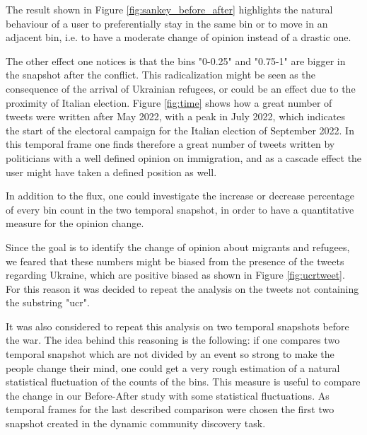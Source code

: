\documentclass[sigchi]{acmart}
\begin{document}
The result shown in Figure \ref{fig:sankey_before_after} highlights the natural behaviour of a user to preferentially stay in the same bin or to move in an adjacent bin, i.e. to have a moderate change of opinion instead of a drastic one.

The other effect one notices is that the bins "0-0.25" and "0.75-1" are bigger in the snapshot after the conflict. This radicalization might be seen as the consequence of the arrival of Ukrainian refugees, or could be an effect due to the proximity of Italian election. Figure \ref{fig:time} shows how a great number of tweets were written after May 2022, with a peak in July 2022, which indicates the start of the electoral campaign for the Italian election of September 2022. In this temporal frame one finds therefore a great number of tweets written by politicians with a well defined opinion on immigration, and as a cascade effect the user might have taken a defined position as well.


In addition to the flux, one could investigate the increase or decrease percentage of every bin count in the two temporal snapshot, in order to have a quantitative measure for the opinion change.

Since the goal is to identify the change of opinion about migrants and refugees, we feared that these numbers might be biased from the presence of the tweets regarding Ukraine, which are positive biased as shown in Figure \ref{fig:ucrtweet}. For this reason it was decided to repeat the analysis on the tweets not containing the substring "ucr". 

It was also considered to repeat this analysis on two temporal snapshots before the war. The idea behind this reasoning is the following: if one compares two temporal snapshot which are not divided by an event so strong to make the people change their mind, one could get a very rough estimation of a natural statistical fluctuation of the counts of the bins. This measure is useful to compare the change in our Before-After study with some statistical fluctuations. 
As temporal frames for the last described comparison were chosen the first two snapshot created in the dynamic community discovery task.
\end{document}
